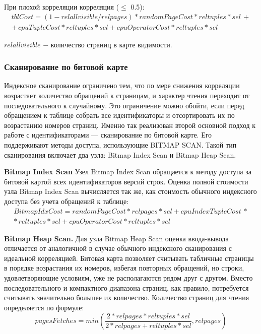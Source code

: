 При плохой корреляции корреляция ($\leq$ 0.5):
\begin{equation}
    \begin{array}{c}
         tblCost = (1 - relallvisible/relpages) * randomPageCost * reltuples * sel \,+ \\
         + \, cpuTupleCost * reltuples * sel + cpuOperatorCost * reltuples * sel
    \end{array}
\end{equation}

$relallvisible$ $-$ количество страниц в карте видимости.

\subsubsection{Сканирование по битовой карте} 

Индексное сканирование ограничено тем, что по мере снижения корреляции возрастает количество обращений к страницам, и характер чтения переходит от последовательного к случайному. Это ограничение можно обойти, если перед обращением к таблице собрать все идентификаторы и отсортировать их по возрастанию номеров страниц. Именно так реализован второй основной подход к работе с идентификаторами — сканирование по битовой карте. Его поддерживают методы доступа, использующие BITMAP SCAN. Такой тип сканирования включает два узла: Bitmap Index Scan и Bitmap Heap Scan.

\textbf{Bitmap Index Scan} Узел Bitmap Index Scan обращается к методу доступа за битовой картой всех идентификаторов версий строк. Оценка полной стоимости узла Bitmap Index Scan вычисляется так же, как стоимость обычного индексного доступа без учета обращений к таблице:
\begin{equation}
    \begin{array}{c}
         BitmapIdxCost = randomPageCost * relpages * sel + cpuIndexTupleCost \, *  \\ * \, reltuples * sel + cpuOperatorCost * reltuples * sel
    \end{array}
\end{equation}

\textbf{Bitmap Heap Scan.} Для узла Bitmap Heap Scan оценка ввода-вывода отличается от аналогичной в случае обычного индексного сканирования с идеальной корреляцией. Битовая карта позволяет считывать табличные страницы в порядке возрастания их номеров, избегая повторных обращений, но строки, удовлетворяющие условиям, уже не располагаются рядом друг с другом. Вместо последовательного и компактного диапазона страниц, как правило, потребуется считывать значительно большее их количество. Количество страниц для чтения определяется по формуле:
\begin{equation}
    pagesFetches = min(\frac{2*relpages*reltuples*sel}{2*relpages+reltuples*sel}, relpages)
\end{equation}

